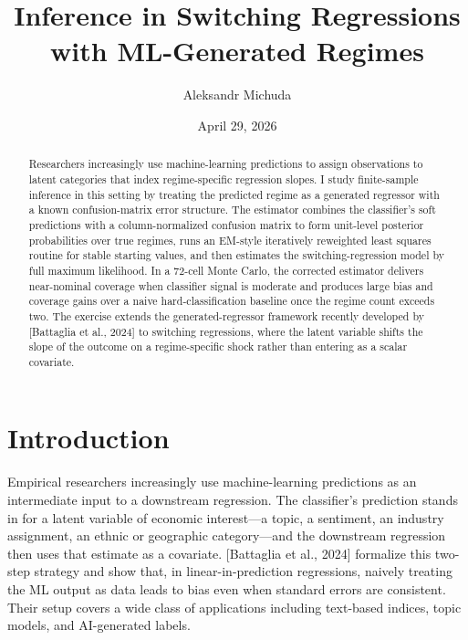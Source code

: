 \documentclass[
  12pt,
  letterpaper]{article}
\title{Inference in Switching Regressions with ML-Generated Regimes}
\author{Aleksandr Michuda}
\date{April 29, 2026}
\begin{document}
\maketitle
\begin{abstract}
Researchers increasingly use machine-learning predictions to assign
observations to latent categories that index regime-specific regression
slopes. I study finite-sample inference in this setting by treating the
predicted regime as a generated regressor with a known confusion-matrix
error structure. The estimator combines the classifier's soft
predictions with a column-normalized confusion matrix to form unit-level
posterior probabilities over true regimes, runs an EM-style iteratively
reweighted least squares routine for stable starting values, and then
estimates the switching-regression model by full maximum likelihood. In
a 72-cell Monte Carlo, the corrected estimator delivers near-nominal
coverage when classifier signal is moderate and produces large bias and
coverage gains over a naive hard-classification baseline once the regime
count exceeds two. The exercise extends the generated-regressor
framework recently developed by {[}Battaglia et al., 2024{]} to
switching regressions, where the latent variable shifts the slope of the
outcome on a regime-specific shock rather than entering as a scalar
covariate.
\end{abstract}


\newpage

\section{Introduction}\label{introduction}

Empirical researchers increasingly use machine-learning predictions as
an intermediate input to a downstream regression. The classifier's
prediction stands in for a latent variable of economic interest---a
topic, a sentiment, an industry assignment, an ethnic or geographic
category---and the downstream regression then uses that estimate as a
covariate. {[}Battaglia et al., 2024{]} formalize this two-step strategy
and show that, in linear-in-prediction regressions, naively treating the
ML output as data leads to bias even when standard errors are
consistent. Their setup covers a wide class of applications including
text-based indices, topic models, and AI-generated labels.
\end{document}
